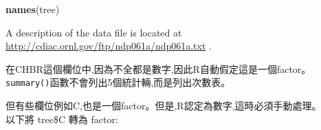 \documentclass[]{book}
\newenvironment{Shaded}{\begin{snugshade}}{\end{snugshade}}
\newcommand{\KeywordTok}[1]{\textcolor[rgb]{0.13,0.29,0.53}{\textbf{#1}}}
\newcommand{\NormalTok}[1]{#1}
\newcommand{\OperatorTok}[1]{\textcolor[rgb]{0.81,0.36,0.00}{\textbf{#1}}}
\newcommand{\StringTok}[1]{\textcolor[rgb]{0.31,0.60,0.02}{#1}}
\theoremstyle{definition}
\theoremstyle{definition}
\theoremstyle{definition}
\theoremstyle{remark}
\begin{document}
\begin{Shaded}
\begin{Highlighting}[]
\KeywordTok{names}\NormalTok{(tree)}
\end{Highlighting}
\end{Shaded}

A description of the data file is located at
\url{http://cdiac.ornl.gov/ftp/ndp061a/ndp061a.txt} .

\begin{Shaded}
\end{Shaded}

在CHBR這個欄位中,因為不全都是數字,因此R自動假定這是一個factor。
\texttt{summary()}函數不會列出5個統計輛,而是列出次數表。

但有些欄位例如C,也是一個factor。但是,R認定為數字,這時必須手動處理。\\
以下將 tree\$C 轉為 factor:

\begin{Shaded}
\end{Shaded}

\begin{Shaded}
\end{Shaded}

\begin{Shaded}
\end{Shaded}

\begin{Shaded}
\end{Shaded}

\begin{Shaded}
\end{Shaded}
\end{document}
